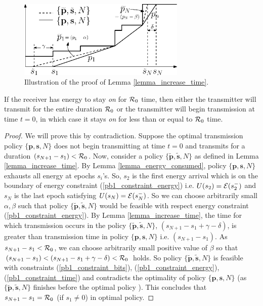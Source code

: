 \begin{figure}
\label{lemma4}
\centering
  \centerline{\includegraphics[width=8cm]{Lemma4.eps}}
\caption{Illustration of the proof of Lemma \ref{lemma_increase_time}.}
\end{figure}

\begin{lemma}
If the receiver has energy to stay \textit{on} for $\mathcal{R}_0$ time, then either the transmitter will transmit for the entire duration $\mathcal{R}_0$ or the transmitter will begin transmission at time $t=0$, in which case it stays \textit{on} for less than or equal to $\mathcal{R}_0$ time. 
\label{transmission_duration}
\end{lemma}
\begin{proof}
We will prove this by contradiction. Suppose the optimal transmission policy $\{\textbf{p},\textbf{s},N\}$ does not begin transmitting at time $t=0$ and transmits for a duration $(s_{N+1}-s_1)< \mathcal{R}_0$. Now, consider a policy $\{\bm{\widetilde{p}},\bm{\widetilde{s}},N\}$ as defined in Lemma \ref{lemma_increase_time}. By Lemma \ref{lemma_energy_consumed}, policy $\{\textbf{p},\textbf{s},N\}$ exhausts all energy at epochs $s_i$'s. So, $s_{2}$ is the first energy arrival which is on the boundary of energy constraint (\ref{pb1_constraint_energy}) i.e. $U(s_2)=\mathcal{E}(s_2^-)$ and $s_{N}$ is the last epoch satisfying $U(s_N)=\mathcal{E}(s_N^-)$. So we can choose arbitrarily small $\alpha ,\beta$ such that policy $\{\bm{\widetilde{p}},\bm{\widetilde{s}},N\}$ would be feasible with respect energy constraint (\ref{pb1_constraint_energy}). By Lemma \ref{lemma_increase_time}, the time for which transmission occurs in the policy $\{\bm{\widetilde{p}},\bm{\widetilde{s}},N\}$, $\left( s_{N+1}-s_1+\gamma-\delta\right)$, is greater than transmission time in policy $\{\textbf{p},\textbf{s},N\}$ i.e. $(s_{N+1}-s_1)$. As $s_{N+1}-s_1<\mathcal{R}_0$, we can choose arbitrarily small positive value of $\beta$ so that $(s_{N+1}-s_1)<(s_{N+1}-s_1+\gamma -\delta)<\mathcal{R}_0$ holds. So policy $\{\bm{\widetilde{p}},\bm{\widetilde{s}},N\}$ is feasible with constraints  (\ref{pb1_constraint_bits}), (\ref{pb1_constraint_energy}), (\ref{pb1_constraint_time}) and contradicts the optimality of policy $\{\textbf{p},\textbf{s},N\}$ (as $\{\bm{\widetilde{p}},\bm{\widetilde{s}},N\}$ finishes before the optimal policy ). This concludes that $s_{N+1}-s_1=\mathcal{R}_0$ (if $s_1\neq 0$) in optimal policy.
\end{proof}